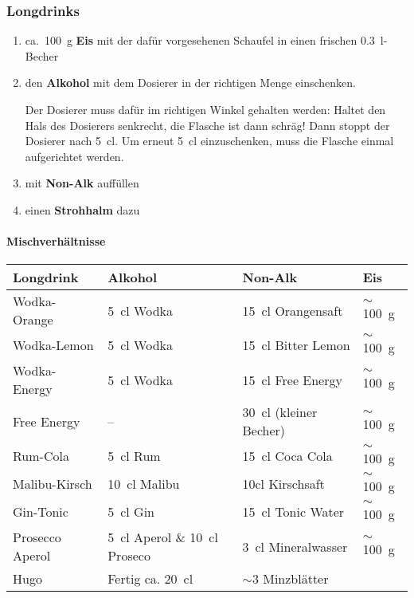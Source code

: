 \subsubsection{Longdrinks}
\begin{enumerate}
    \item ca.\ \SI{100}{\gram} \textbf{Eis} mit der dafür vorgesehenen Schaufel in einen frischen \SI{0.3}{\litre}-Becher
    \item den \textbf{Alkohol} mit dem Dosierer in der richtigen Menge einschenken.

        Der Dosierer muss dafür im richtigen Winkel gehalten werden: Haltet den Hals des Dosierers senkrecht, die Flasche ist dann schräg! Dann stoppt der Dosierer nach \SI{5}{\centi\litre}. Um erneut \SI{5}{\centi\litre} einzuschenken, muss die Flasche einmal aufgerichtet werden.
    \item mit \textbf{Non-Alk} auffüllen
    \item einen \textbf{Strohhalm} dazu
\end{enumerate}

\paragraph{Mischverhältnisse}
\begin{center}
    \begin{tabular}{llll}
        Longdrink & Alkohol & Non-Alk & Eis \\ \hline\hline
        Wodka-Orange &  \SI{5}{\centi\litre} Wodka & \SI{15}{\centi\litre} Orangensaft & $\sim$\SI{100}{\gram} \\ \hline
        Wodka-Lemon & \SI{5}{\centi\litre} Wodka & \SI{15}{\centi\litre} Bitter Lemon & $\sim$\SI{100}{\gram} \\ \hline
        Wodka-Energy & \SI{5}{\centi\litre} Wodka & \SI{15}{\centi\litre} Free Energy & $\sim$\SI{100}{\gram} \\ \hline
        Free Energy & -- & \SI{30}{\centi\litre} (kleiner Becher) & $\sim$\SI{100}{\gram} \\ \hline
        Rum-Cola & \SI{5}{\centi\litre} Rum & \SI{15}{\centi\litre} Coca Cola & $\sim$\SI{100}{\gram} \\ \hline
        Malibu-Kirsch & \SI{10}{\centi\litre} Malibu & 10cl Kirschsaft & $\sim$\SI{100}{\gram} \\ \hline
        Gin-Tonic & \SI{5}{\centi\litre} Gin & \SI{15}{\centi\litre} Tonic Water & $\sim$\SI{100}{\gram} \\ \hline
        Prosecco Aperol & \SI{5}{\centi\litre} Aperol \& \SI{10}{\centi\litre} Proseco & \SI{3}{\centi\litre} Mineralwasser & $\sim$\SI{100}{\gram} \\ \hline
        Hugo & Fertig ca. \SI{20}{\centi\litre} & $\sim$3 Minzblätter
    \end{tabular}
\end{center}


